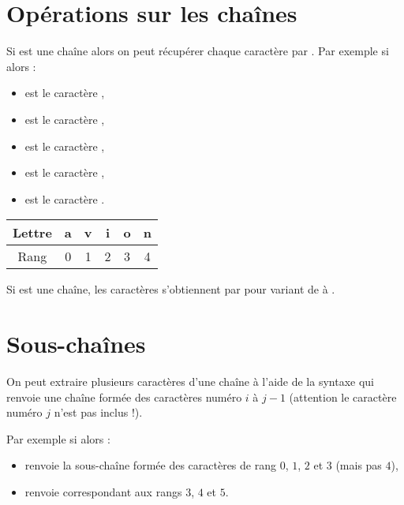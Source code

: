 \documentclass[12pt,class=report,crop=false]{standalone}
\begin{document}
\newpage  
 
\section*{Opérations sur les chaînes}
 
Si  est une chaîne alors on peut récupérer chaque caractère par . Par exemple si 
   alors :
  \begin{itemize}
    \item {} est le caractère ,
    \item {} est le caractère , 
    \item {} est le caractère ,
    \item {} est le caractère ,       
    \item {} est le caractère .
  \end{itemize} 
  
\bigskip  
  
\begin{center}
\begin{tabular}{|c||c|c|c|c|c|}
\hline
Lettre & a & v & i & o & n \\ \hline
Rang & 0 & 1 & 2 & 3 & 4 \\ \hline
\end{tabular}
\end{center}


\bigskip

Si  est une chaîne, les caractères s'obtiennent par  pour  variant de  à .




\newpage

\section*{Sous-chaînes}


On peut extraire plusieurs caractères d'une chaîne à l'aide de la syntaxe  qui renvoie une chaîne formée des caractères numéro $i$ à $j-1$ (attention le caractère numéro $j$ n'est pas inclus !).

    \bigskip

Par exemple si  alors :
\begin{itemize}
  \item {} renvoie la sous-chaîne  formée des caractères de rang $0$, $1$, $2$ et $3$ (mais pas $4$),
  
      \bigskip
      
  \item {} renvoie  correspondant aux rangs $3$, $4$ et $5$.
\end{itemize}  
\end{document}
